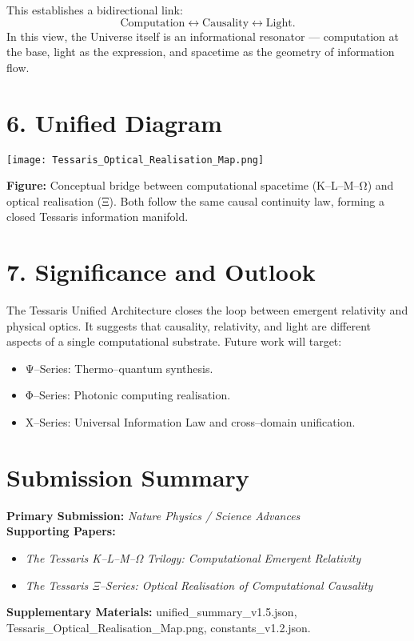 \documentclass[11pt,a4paper]{article}
\begin{document}
This establishes a bidirectional link:
\[
\text{Computation} \leftrightarrow \text{Causality} \leftrightarrow \text{Light}.
\]
In this view, the Universe itself is an informational resonator --- computation at the base, light as the expression, and spacetime as the geometry of information flow.

\section{6. Unified Diagram}
\begin{center}
\texttt{[image: Tessaris\_Optical\_Realisation\_Map.png]}
\end{center}
\textbf{Figure:} Conceptual bridge between computational spacetime (K--L--M--Ω) and optical realisation (Ξ).  
Both follow the same causal continuity law, forming a closed Tessaris information manifold.

\section{7. Significance and Outlook}
The Tessaris Unified Architecture closes the loop between emergent relativity and physical optics.  
It suggests that causality, relativity, and light are different aspects of a single computational substrate.  
Future work will target:
\begin{itemize}
  \item Ψ--Series: Thermo--quantum synthesis.
  \item Φ--Series: Photonic computing realisation.
  \item X--Series: Universal Information Law and cross--domain unification.
\end{itemize}

\section*{Submission Summary}
\textbf{Primary Submission:} \emph{Nature Physics / Science Advances}\\[0.3em]
\textbf{Supporting Papers:}
\begin{itemize}
  \item \textit{The Tessaris K--L--M--Ω Trilogy: Computational Emergent Relativity}
  \item \textit{The Tessaris Ξ--Series: Optical Realisation of Computational Causality}
\end{itemize}
\textbf{Supplementary Materials:} unified\_summary\_v1.5.json, Tessaris\_Optical\_Realisation\_Map.png, constants\_v1.2.json.
\end{document}
